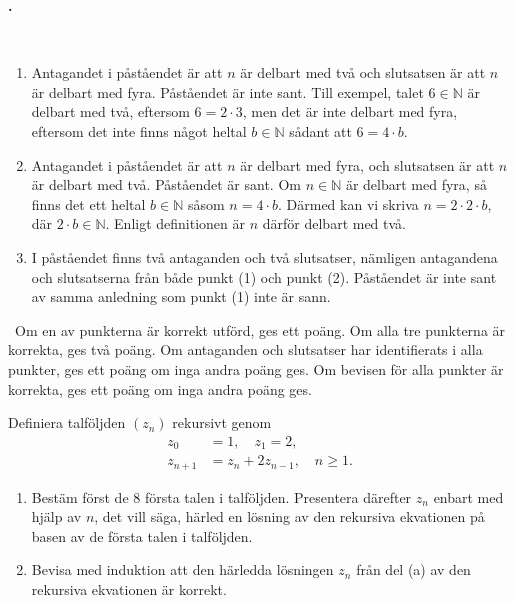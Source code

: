 \documentclass[11pt,a4paper,oneside,notitlepage,final]{article}
\newcounter{harjnro}
\newenvironment{harjlist}
  {\begin{list}{\kor{\arabic{harjnro}.}}
    {\usecounter{harjnro}
      \setlength{\labelwidth}{0em}
      \setlength{\labelsep}{0.4em}
      \setlength{\leftmargin}{0pt}
      \setlength{\parsep}{5pt}
      \setlength{\itemindent}{0.4em}
      \setlength{\topsep}{0.5\parskip}
      \setlength{\itemsep}{0.75\parskip}
    }
  }
  {\end{list}}
\newcommand{\kor}[1]{\textbf{#1}}
\begin{document}
\begin{harjlist}
\vspace{0.4cm}
\losning \
\begin{enumerate}
\item[(1)] Antagandet i påståendet är att $n$ är delbart med två och slutsatsen är att $n$ är delbart med fyra. Påståendet är inte sant. Till exempel, talet $6 \in \mathbb{N}$ är delbart med två, eftersom $6=2\cdot 3$, men det är inte delbart med fyra, eftersom det inte finns något heltal $b \in \mathbb{N}$ sådant att $6=4\cdot b$.

\item[(2)] Antagandet i påståendet är att $n$ är delbart med fyra, och slutsatsen är att $n$ är delbart med två. Påståendet är sant. Om $n \in \mathbb{N}$ är delbart med fyra, så finns det ett heltal $b \in \mathbb{N}$ såsom $n=4\cdot b$. Därmed kan vi skriva $n=2\cdot 2\cdot b$, där $2\cdot b \in \mathbb{N}$. Enligt definitionen är $n$ därför delbart med två.

\item[(3)] I påståendet finns två antaganden och två slutsatser, nämligen antagandena och slutsatserna från både punkt (1) och punkt (2). Påståendet är inte sant av samma anledning som punkt (1) inte är sann.
\end{enumerate}


\bedomning \
Om en av punkterna är korrekt utförd, ges ett poäng. Om alla tre punkterna är korrekta, ges två poäng. Om antaganden och slutsatser har identifierats i alla punkter, ges ett poäng om inga andra poäng ges. Om bevisen för alla punkter är korrekta, ges ett poäng om inga andra poäng ges.


\item[6.] Definiera talföljden $(z_n)$ rekursivt genom 
\begin{align*}
z_0&=1,\quad z_1=2,\\
z_{n+1}&=z_n+2z_{n-1},\quad n\geqslant 1.
\end{align*}
\begin{enumerate}
\item[(a)] Bestäm först de 8 första talen i talföljden. Presentera därefter  $z_n$ enbart med hjälp av  $n$, det vill säga, härled en lösning av  den rekursiva ekvationen 
på basen av de första talen i talföljden.
\item[(b)] Bevisa med induktion att den härledda lösningen $z_n$  från del (a) av den rekursiva ekvationen 
är  korrekt. 
\end{enumerate}


\end{harjlist}
\end{document}
